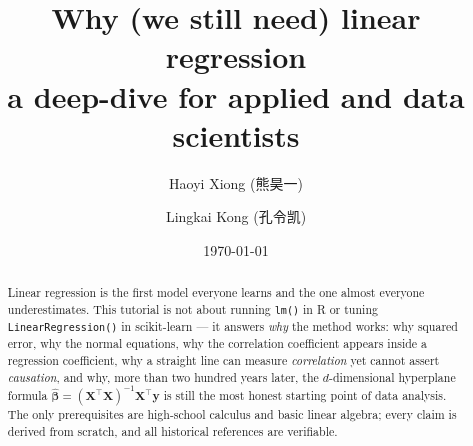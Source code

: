 \documentclass[11pt, a4paper]{article}
\title{\Huge \textbf{Why (we still need) linear regression}\\[6pt]
\Large a deep-dive for applied and data scientists}
\author{Haoyi Xiong (熊昊一) \and Lingkai Kong (孔令凯)}
\date{\today}
\theoremstyle{plain}
\theoremstyle{definition}
\theoremstyle{remark}
\newcommand{\X}{\mathbf{X}}
\newcommand{\y}{\mathbf{y}}
\begin{document}
\maketitle

\begin{abstract}
\noindent
Linear regression is the first model everyone learns and the one almost everyone underestimates.
This tutorial is not about running \texttt{lm()} in R or tuning \texttt{LinearRegression()} in scikit-learn --- it answers \textit{why} the method works: why squared error, why the normal equations, why the correlation coefficient appears inside a regression coefficient, why a straight line can measure \textit{correlation} yet cannot assert \textit{causation}, and why, more than two hundred years later, the $d$-dimensional hyperplane formula
$\widehat{\bm{\beta}} = (\X^\top \X)^{-1} \X^\top \y$
is still the most honest starting point of data analysis.
The only prerequisites are high-school calculus and basic linear algebra; every claim is derived from scratch, and all historical references are verifiable.
\end{abstract}

\newpage
\tableofcontents
\newpage



\clearpage

\clearpage

\clearpage

\clearpage

\clearpage

\clearpage

\clearpage

\clearpage

\clearpage

\clearpage

\end{document}
